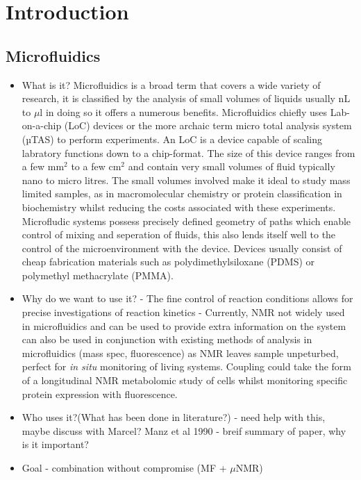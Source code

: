 
\chapter{Introduction}

\section{Microfluidics}

\begin{itemize}
  \item What is it?
Microfluidics is a broad term that covers a wide variety of research, it is classified by the analysis of small
volumes of liquids usually nL to $\mu$l in doing so it offers a numerous benefits. Microfluidics chiefly uses
Lab-on-a-chip (LoC) devices or the more archaic term micro total analysis system (µTAS) to perform experiments. An LoC is
a device capable of scaling labratory functions down to a chip-format. The size of this device ranges from a few mm$^2$ to a few cm$^2$
and contain very small volumes of fluid typically nano to micro litres. The small
volumes involved make it ideal to study mass limited samples, as in macromolecular chemistry or protein classification
in biochemistry whilst reducing the costs associated with these experiments. Microfludic systems possess precisely defined
geometry of paths which enable control of mixing and seperation of fluids, this also lends itself well to the control of the
microenvironment with the device. Devices usually consist of cheap fabrication materials such as polydimethylsiloxane
(PDMS) or polymethyl methacrylate (PMMA).
  \item Why do we want to use it?
- The fine control of reaction conditions allows for precise investigations of reaction kinetics
- Currently, NMR not widely used in microfluidics and can be used to provide extra information on the system
can also be used in conjunction with existing methods of analysis in microfluidics (mass spec, fluorescence)
as NMR leaves sample unpeturbed, perfect for \textit{in situ} monitoring of living systems. Coupling
could take the form of a longitudinal NMR metabolomic study of cells whilst monitoring specific protein
expression with fluorescence.
  \item Who uses it?(What has been done in literature?)
- need help with this, maybe discuss with Marcel? Manz et al 1990 - breif summary of paper, why is it important?
  \item Goal - combination without compromise (MF + $\mu$NMR)

\end{itemize}
